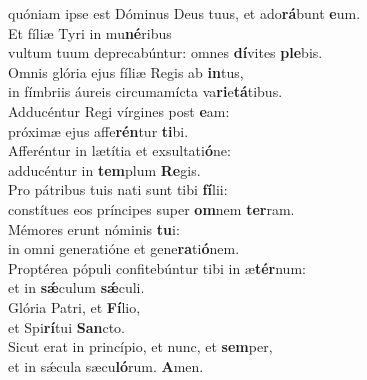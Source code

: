 \oddverse quóniam ipse est Dóminus Deus tuus, et ado\textbf{rá}bunt \textbf{e}um.\\
\evenverse Et fíliæ Tyri in mu\textbf{né}ribus~\*\\
\evenverse vultum tuum deprecabúntur: omnes \textbf{dí}vites \textbf{ple}bis.\\
\oddverse Omnis glória ejus fíliæ Regis ab \textbf{in}tus,~\*\\
\oddverse in fímbriis áureis circumamícta va\textbf{ri}e\textbf{tá}tibus.\\
\evenverse Adducéntur Regi vírgines post \textbf{e}am:~\*\\
\evenverse próximæ ejus affe\textbf{rén}tur \textbf{ti}bi.\\
\oddverse Afferéntur in lætítia et exsultati\textbf{ó}ne:~\*\\
\oddverse adducéntur in \textbf{tem}plum \textbf{Re}gis.\\
\evenverse Pro pátribus tuis nati sunt tibi \textbf{fí}lii:~\*\\
\evenverse constítues eos príncipes super \textbf{om}nem \textbf{ter}ram.\\
\oddverse Mémores erunt nóminis \textbf{tu}i:~\*\\
\oddverse in omni generatióne et gene\textbf{ra}ti\textbf{ó}nem.\\
\evenverse Proptérea pópuli confitebúntur tibi in æ\textbf{tér}num:~\*\\
\evenverse et in \textbf{sǽ}culum \textbf{sǽ}culi.\\
\oddverse Glória Patri, et \textbf{Fí}lio,~\*\\
\oddverse et Spi\textbf{rí}tui \textbf{San}cto.\\
\evenverse Sicut erat in princípio, et nunc, et \textbf{sem}per,~\*\\
\evenverse et in sǽcula sæcu\textbf{ló}rum. \textbf{A}men.\\
